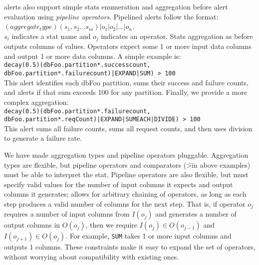 {\helix alerts also support simple stats enumeration and aggregation before alert evaluation using \emph{pipeline operators}.  Pipelined alerts follow the format: \\
$(aggregate_type)(s_1, s_2 \ldots s_m)|o_1|o_2| \ldots |o_n$. \\
$s_i$ indicates a stat name and $o_j$ indicates an operator.  Stats aggregation as before outputs columns of values.  Operators expect some 1 or more input data columns and output 1 or more data columns.  A simple example is: \\
\texttt{decay(0.5)(dbFoo.partition*.successcount, dbFoo.partition*.failurecount)|EXPAND|SUM) > 100} \\
This alert identifies each dbFoo partition, sums their success and failure counts, and alerts if that sum exceeds 100 for any partition. 
Finally, we provide a more complex aggregation: \\
\texttt{decay(0.5)(dbFoo.partition*.failurecount, dbFoo.partition*.reqCount)|EXPAND|SUMEACH|DIVIDE) > 100} \\
This alert sums all failure counts, sums all request counts, and then uses division to generate a failure rate.

We have made aggregation types and pipeline operators pluggable.  Aggregation types are flexible, but pipeline operators and comparators (\">\" in above examples) must be able to interpret the stat.  Pipeline operators are also flexible, but must specify valid values for the number of input columns it expects and output columns it generates; \helix allows for arbitrary chaining of operators, as long as each step produces a valid number of columns for the next step.  That is, if operator $o_j$ requires a number of input columns from $I(o_j)$ and generates a number of output columns in $O(o_j)$, then we require $I(o_j) \in O(o_{j-1})$ and $I(o_{j+1}) \in O(o_j)$.  For example, \texttt{SUM} takes 1 or more input columns and outputs 1 columns.  These constraints make it easy to expand the set of operators, without worrying about compatibility with existing ones.

}%
